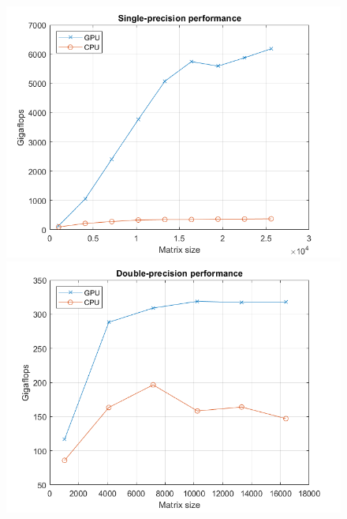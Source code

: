 \begin{center}
\begin{figure}[H]
\centering
\begin{minipage}[b]{0.32\linewidth}
\centering
\includegraphics[width=\linewidth]{Figures/Imagenes/single.png}
\caption{}
\end{minipage}
\begin{minipage}[b]{0.32\linewidth}
\centering
\includegraphics[width=\linewidth]{Figures/Imagenes/double.png}
\caption{}
\end{minipage}
\begin{minipage}[b]{0.32\linewidth}
\centering

\end{minipage}
\end{figure}
\end{center}
